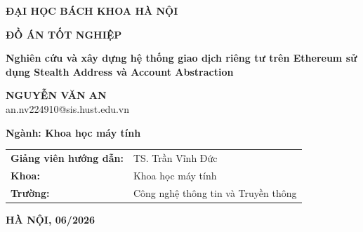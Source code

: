 \documentclass[DoAn.tex]{subfiles}
\begin{document}
\begin{titlepage}
\thispagestyle{empty}
\begin{center}

{\textbf{\large ĐẠI HỌC BÁCH KHOA HÀ NỘI}}

\vfill

{\textbf{\huge ĐỒ ÁN TỐT NGHIỆP}}

\vspace{0.8cm}

{\textbf{\Large Nghiên cứu và xây dựng hệ thống giao dịch riêng tư trên Ethereum sử dụng Stealth Address và Account Abstraction}}

\vspace{0.8cm}

{\textbf{\large NGUYỄN VĂN AN}}\\
{\large an.nv224910@sis.hust.edu.vn}

\vspace{0.5cm}

{\textbf{\large Ngành: Khoa học máy tính}}

\vfill

\begin{tabular}{ll}
\textbf{Giảng viên hướng dẫn:} & TS. Trần Vĩnh Đức\\
\textbf{Khoa:} & Khoa học máy tính\\
\textbf{Trường:} & Công nghệ thông tin và Truyền thông\\
\end{tabular}

\vfill

{\textbf{HÀ NỘI, 06/2026}}

\end{center}
\end{titlepage}
\end{document}

